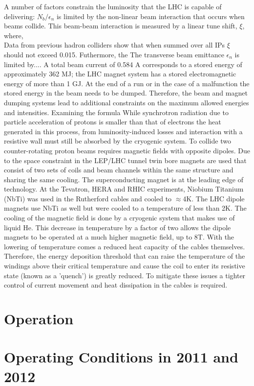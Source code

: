 A number of factors constrain the luminosity that the LHC is capable
of delivering: $N_{b}/\epsilon_{n}$ is limited by the%
non-linear beam interaction that occurs when beams collide. This
beam-beam interaction is measured by a linear tune shift, $\xi$, where,
\begin{equation}
\end{equation}
Data from previous hadron colliders show that when summed over
all IPs $\xi$ should not exceed 0.015. %
Futhermore, the %
The transverse beam emittance $\epsilon_{n}$ is limited by.... 
A total beam current of 0.584 A corresponds to a stored energy
of approximately 362 MJ; the LHC magnet system has a stored
electromagnetic energy of more than 1 GJ.
At the end of a run or in the case of a malfunction the stored
energy in the beam needs to be dumped. Therefore, the beam
and magnet dumping systems lead to additional constraints
on the maximum allowed energies and intensities.
Examining the formula
While synchrotron radiation due to particle acceleration of protons%
is smaller than that of electrons the heat generated in this process,
 from luminosity-induced losses and interaction with a resistive wall
must still be absorbed by the cryogenic system. 
To collide two counter-rotating proton beams requires magnetic fields
with opposite dipoles. Due to the space constraint in the LEP/LHC
tunnel twin bore magnets are used that consist of two sets of 
coils and beam channels within the same structure and
sharing the same cooling. 
The superconducting magnet is at the leading edge of technology.
At the Tevatron, HERA and RHIC experiments, Niobium Titanium (NbTi)
was used in the Rutherford cables and cooled to $\approx$4K. 
The LHC dipole magnets use NbTi as well but were cooled
to a temperature of less than 2K. 
The cooling of the magnetic field is done%
by a cryogenic system that makes use of liquid He.
This decrease in temperature
by a factor of two allows the dipole magnets to be operated 
at a much higher magnetic field, up to 8T. With the lowering of
temperature comes a reduced heat capacity of the cables themselves.
Therefore, the energy deposition threshold that can raise the 
temperature of the windings above their critical temperature and
cause the coil to enter its resistive state (known as a 'quench') is greatly
reduced. To mitigate these issues a tighter control of current movement
and heat dissipation in the cables is required. 
\section{Operation}

\section{Operating Conditions in 2011 and 2012}

